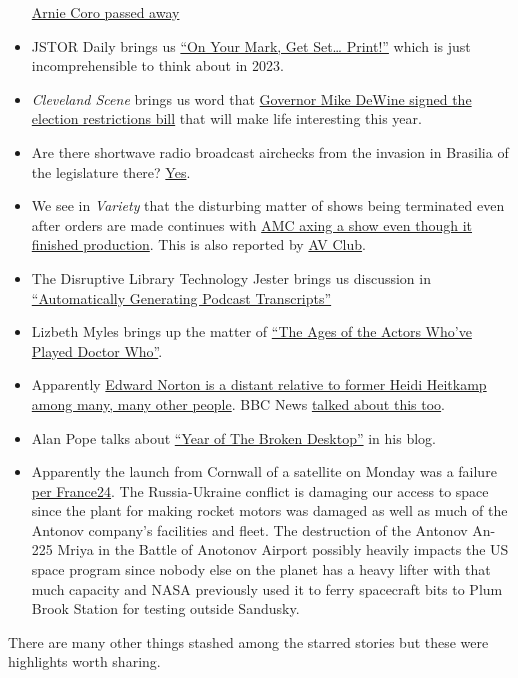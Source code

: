 \begin{itemize}
  \href{https://mt-shortwave.blogspot.com/2023/01/radio-habana-cubas-arnaldo-arnie-coro.html}{Arnie
  Coro passed away}
\item
  JSTOR Daily brings us
  \href{https://daily.jstor.org/on-your-mark-get-set-print/}{``On Your
  Mark, Get Set\ldots{} Print!''} which is just incomprehensible to
  think about in 2023.
\item
  \emph{Cleveland Scene} brings us word that
  \href{https://www.clevescene.com/news/ohio-gov-mike-dewine-signs-citizenship-status-voter-id-bill-41182933}{Governor
  Mike DeWine signed the election restrictions bill} that will make life
  interesting this year.
\item
  Are there shortwave radio broadcast airchecks from the invasion in
  Brasilia of the legislature there?
  \href{https://swling.com/blog/2023/01/carlos-shortwave-art-and-recording-of-china-radio-international-invasion-of-brazilian-congress-january-8-2023/}{Yes}.
\item
  We see in \emph{Variety} that the disturbing matter of shows being
  terminated even after orders are made continues with
  \href{https://variety.com/2023/tv/news/pantheon-canceled-season-two-amc-plus-1235481759/}{AMC
  axing a show even though it finished production}. This is also
  reported by
  \href{https://www.avclub.com/amc-cancels-61st-street-tosses-already-filmed-second-s-1849960939}{AV
  Club}.
\item
  The Disruptive Library Technology Jester brings us discussion in
  \href{https://dltj.org/article/generating-podcast-transcripts/}{``Automatically
  Generating Podcast Transcripts''}
\item
  Lizbeth Myles brings up the matter of
  \href{https://lmmyles.com/2023/01/06/the-ages-of-the-actors-whove-played-doctor-who/}{``The
  Ages of the Actors Who've Played Doctor Who''}.
\item
  Apparently
  \href{https://www.avclub.com/edward-norton-related-to-pocahontas-1849953198}{Edward
  Norton is a distant relative to former Heidi Heitkamp among many, many
  other people}. BBC News
  \href{https://www.bbc.co.uk/news/world-us-canada-64158055}{talked
  about this too}.
\item
  Alan Pope talks about
  \href{https://popey.com/blog/2023/01/year-of-the-broken-desktop/}{``Year
  of The Broken Desktop''} in his blog.
\item
  Apparently the launch from Cornwall of a satellite on Monday was a
  failure
  \href{https://www.france24.com/en/europe/20230110-virgin-orbit-s-groundbreaking-satellite-launch-ends-in-failure}{per
  France24}. The Russia-Ukraine conflict is damaging our access to space
  since the plant for making rocket motors was damaged as well as much
  of the Antonov company's facilities and fleet. The destruction of the
  Antonov An-225 Mriya in the Battle of Anotonov Airport possibly
  heavily impacts the US space program since nobody else on the planet
  has a heavy lifter with that much capacity and NASA previously used it
  to ferry spacecraft bits to Plum Brook Station for testing outside
  Sandusky.
\end{itemize}

There are many other things stashed among the starred stories but these
were highlights worth sharing.
